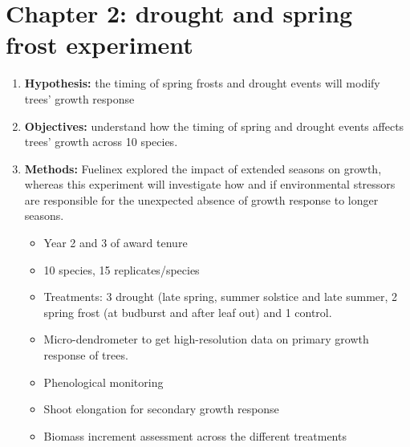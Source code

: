 \documentclass{article}
\begin{document}
\section*{Chapter 2: drought and spring frost experiment}
\begin {enumerate}
	\item \textbf{Hypothesis:} the timing of spring frosts and drought events\citep{babst_twentieth_2019,buermann_widespread_2018,dorangeville_drought_2018,helcoski_growing_2019,mcmahon_general_2015} will modify trees' growth response 
	\item \textbf{Objectives:} understand how the timing of spring and drought events affects trees' growth across 10 species. 
	\item \textbf{Methods:} Fuelinex explored the impact of extended seasons on growth, whereas this experiment will investigate how and if environmental stressors are responsible for the unexpected absence of growth response to longer seasons. 
		\begin {itemize}
			\item Year 2 and 3 of award tenure
			\item 10 species, 15 replicates/species
			\item Treatments: 3 drought (late spring, summer solstice and late summer, 2 spring frost (at budburst and after leaf out) and 1 control. 
			\item Micro-dendrometer to get high-resolution data on primary growth response of trees.
			\item Phenological monitoring 
			\item Shoot elongation for secondary growth response
			\item Biomass increment assessment across the different treatments
		\end{itemize}
\end {enumerate}

\end{document}
